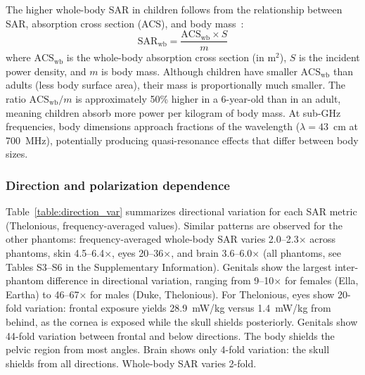 \documentclass{iopjournal}
\begin{document}
The higher whole-body \gls{SAR} in children follows from the relationship between \gls{SAR}, absorption cross section (ACS), and body mass~\citep{bamba2015absorption}:
\begin{equation}
\mathrm{SAR}_\mathrm{wb} = \frac{\mathrm{ACS}_\mathrm{wb} \times S}{m}
\label{eq:sar_acs}
\end{equation}
where $\mathrm{ACS}_\mathrm{wb}$ is the whole-body absorption cross section (in m$^2$), $S$ is the incident power density, and $m$ is body mass.
Although children have smaller $\mathrm{ACS}_\mathrm{wb}$ than adults (less body surface area), their mass is proportionally much smaller.
The ratio $\mathrm{ACS}_\mathrm{wb}/m$ is approximately 50\% higher in a 6-year-old than in an adult, meaning children absorb more power per kilogram of body mass.
At sub-GHz frequencies, body dimensions approach fractions of the wavelength ($\lambda = 43$~cm at 700~MHz), potentially producing quasi-resonance effects that differ between body sizes.

\subsubsection{Direction and polarization dependence}

Table~\ref{table:direction_var} summarizes directional variation for each \gls{SAR} metric (Thelonious, frequency-averaged values).
Similar patterns are observed for the other phantoms: frequency-averaged whole-body \gls{SAR} varies 2.0--2.3$\times$ across phantoms, skin 4.5--6.4$\times$, eyes 20--36$\times$, and brain 3.6--6.0$\times$ (all phantoms, see Tables S3--S6 in the Supplementary Information).
Genitals show the largest inter-phantom difference in directional variation, ranging from 9--10$\times$ for females (Ella, Eartha) to 46--67$\times$ for males (Duke, Thelonious).
For Thelonious, eyes show 20-fold variation: frontal exposure yields 28.9~mW/kg versus 1.4~mW/kg from behind, as the cornea is exposed while the skull shields posteriorly.
Genitals show 44-fold variation between frontal and below directions. The body shields the pelvic region from most angles.
Brain shows only 4-fold variation: the skull shields from all directions.
Whole-body \gls{SAR} varies 2-fold.
\end{document}
